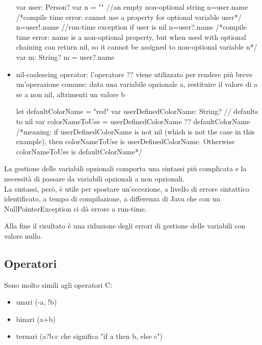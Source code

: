 \begin{itemize}
    \begin{Swift}
        var user: Person?
        var n = "" //an empty non-optional string
        n=user.name /*compile time error: cannot use a 
        property for optional variable user*/
        n=user!.name //run-time exception if user is nil
        n=user?.name /*compile time error: name is a 
        non-optional property, but when used with 
        optional chaining can return nil, so it cannot 
        be assigned to non-optional variable n*/
        var m: String?
        m = user?.name
    \end{Swift}
    \item nil-coalescing operator: l'operatore ?? viene utilizzato per rendere più breve un'operazione comune: data una variabile opzionale a, restituire il valore di a se a non nil, altrimenti un valore b
    \begin{Swift}
        let defaultColorName = "red"
        var userDefinedColorName: String? // defaults to nil
        var colorNameToUse = userDefinedColorName ??
                             defaultColorName
        /*meaning: if userDefinedColorName is not nil (which 
        is not the case in this example), then colorNameToUse 
        is userDefinedColorName. Otherwise colorNameToUse is
        defaultColorName*/
    \end{Swift}
\end{itemize}

La gestione delle variabili opzionali comporta una sintassi più complicata e la necessità di passare da variabili opzionali a non opzionali.
\\ La sintassi, però, è utile per spostare un'eccezione, a livello di errore sintattico identificato, a tempo di compilazione, a differenza di Java che con un NullPointerException ci dà errore a run-time.

Alla fine il risultato è una riduzione degli errori di gestione delle variabili con valore nullo. 

\subsection{Operatori}
Sono molto simili agli operatori C:
\begin{itemize}
    \item unari (-a, !b)
    \item binari (a+b)
    \item ternari (a?b:c che significa "if a then b, else c")
\end{itemize}

